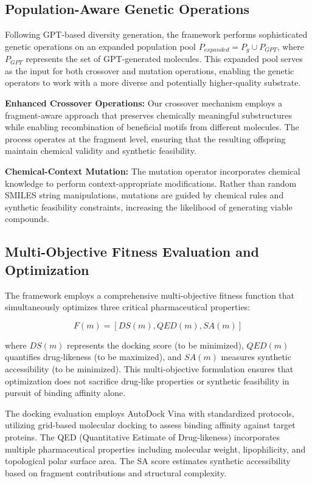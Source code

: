 \documentclass[lettersize,journal]{IEEEtran}
\begin{document}
\subsection{Population-Aware Genetic Operations}

Following GPT-based diversity generation, the framework performs sophisticated genetic operations on an expanded population pool $P_{expanded} = P_g \cup P_{GPT}$, where $P_{GPT}$ represents the set of GPT-generated molecules. This expanded pool serves as the input for both crossover and mutation operations, enabling the genetic operators to work with a more diverse and potentially higher-quality substrate.

\noindent \textbf{Enhanced Crossover Operations:} Our crossover mechanism employs a fragment-aware approach that preserves chemically meaningful substructures while enabling recombination of beneficial motifs from different molecules. The process operates at the fragment level, ensuring that the resulting offspring maintain chemical validity and synthetic feasibility.

\noindent \textbf{Chemical-Context Mutation:} The mutation operator incorporates chemical knowledge to perform context-appropriate modifications. Rather than random SMILES string manipulations, mutations are guided by chemical rules and synthetic feasibility constraints, increasing the likelihood of generating viable compounds.
\subsection{Multi-Objective Fitness Evaluation and Optimization}

The framework employs a comprehensive multi-objective fitness function that simultaneously optimizes three critical pharmaceutical properties:

\begin{equation}
F(m) = [DS(m), QED(m), SA(m)]
\end{equation}

where $DS(m)$ represents the docking score (to be minimized), $QED(m)$ quantifies drug-likeness (to be maximized), and $SA(m)$ measures synthetic accessibility (to be minimized). This multi-objective formulation ensures that optimization does not sacrifice drug-like properties or synthetic feasibility in pursuit of binding affinity alone.

The docking evaluation employs AutoDock Vina\cite{trott2010autodock} with standardized protocols, utilizing grid-based molecular docking to assess binding affinity against target proteins. The QED (Quantitative Estimate of Drug-likeness) incorporates multiple pharmaceutical properties including molecular weight, lipophilicity, and topological polar surface area. The SA score estimates synthetic accessibility based on fragment contributions and structural complexity.
\end{document}

